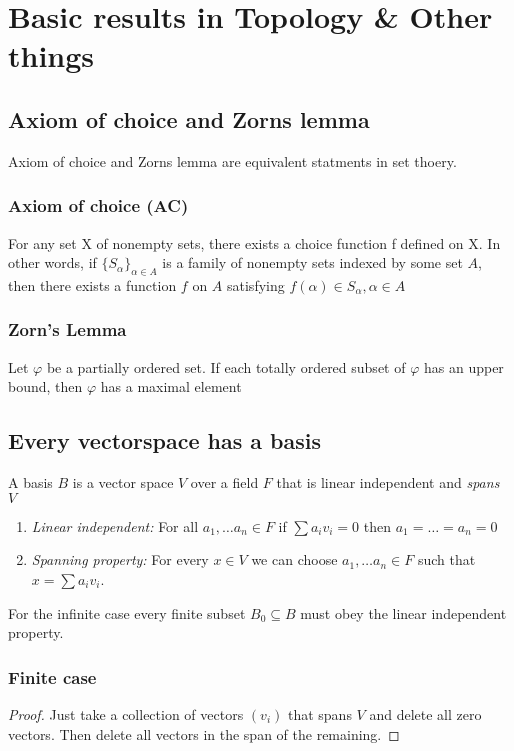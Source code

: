 \documentclass[titlepage]{article}
\begin{document}
\tableofcontents
\newpage
\section{Basic results in Topology \& Other things}
\subsection{Axiom of choice and Zorns lemma}
Axiom of choice and Zorns lemma are equivalent statments in set thoery.
\subsubsection{Axiom of choice (AC)} 
For any set X of nonempty sets, there exists a choice function f defined on X.
In other words, if $\{S_\alpha\}_{\alpha \in A}$ is a family of nonempty sets indexed by some set $A$, then there exists a function $f$ on $A$ satisfying $f(\alpha) \in S_\alpha, \alpha \in A$
\subsubsection{Zorn's Lemma}
Let $\varphi$ be a partially ordered set. If each totally ordered subset of $\varphi$ has an upper bound, then $\varphi$ has a maximal element


\subsection{Every vectorspace has a basis}
A basis $B$ is a vector space $V$ over a field $F$ that is linear independent and \textit{spans} $V$
\begin{enumerate}
\item \textit{Linear independent:} For all $a_1, \ldots a_n \in F$ if $\sum a_iv_i = 0$ then $a_1=\ldots = a_n = 0$
\item \textit{Spanning property:} For every $x \in V$ we can choose $a_1, \ldots a_n \in F$ such that $x = \sum a_iv_i$.
\end{enumerate}

For the infinite case every finite subset $B_0  \subseteq B$ must obey the linear independent property.
\subsubsection{
Finite case}
\begin{proof}
Just take a collection of vectors $(v_i)$ that spans $V$ and delete 
all zero vectors. Then delete all vectors in the span of the remaining.
\end{proof}
\end{document}
